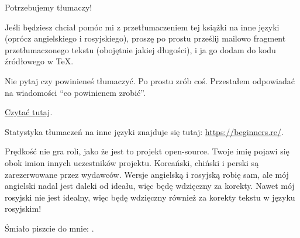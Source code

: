 \vspace*{\fill}

\Huge Potrzebujemy tłumaczy!
\normalsize

\bigskip
\bigskip
\bigskip

Jeśli będziesz chciał pomóc mi z przetłumaczeniem tej książki na inne języki (oprócz angielskiego i rosyjskiego),
proszę po prostu prześlij mailowo fragment przetłumaczonego tekstu (obojętnie jakiej długości), i ja go dodam do kodu źródłowego w TeX.

Nie pytaj czy powinieneś tłumaczyć. Po prostu zrób coś. Przestałem odpowiadać na wiadomości ``co powinienem zrobić''.

\href{\RepoURL/Translation.md}{Czytać tutaj}.

Statystyka tłumaczeń na inne języki znajduje się tutaj: \url{https://beginners.re/}.

Prędkość nie gra roli, jako że jest to projekt open-source.
Twoje imię pojawi się obok imion innych uczestników projektu.
Koreański, chiński i perski są zarezerwowane przez wydawców.
Wersje angielską i rosyjską robię sam, ale mój angielski nadal jest daleki od ideału, więc będę wdzięczny za korekty.
Nawet mój rosyjski nie jest idealny, więc będę wdzięczny również za korekty tekstu w języku rosyjskim!

Śmiało piszcie do mnie: \GTT{\EMAILS}.

\vspace*{\fill}
\vfill

